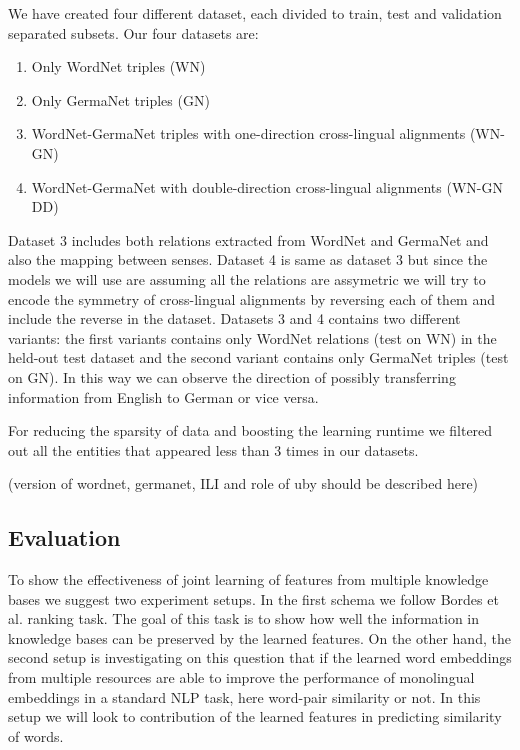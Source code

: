  We have created four different dataset, each divided to train, test and validation separated subsets. Our four datasets are:
 \begin{enumerate}
 \item Only WordNet triples (WN)
 \item Only GermaNet triples (GN)
 \item WordNet-GermaNet triples with one-direction cross-lingual alignments (WN-GN)
 \item WordNet-GermaNet with double-direction cross-lingual alignments (WN-GN DD)
 \end{enumerate}
 
 Dataset 3 includes both relations extracted from WordNet and GermaNet and also the mapping between senses.
 Dataset 4 is same as dataset 3 but since the models we will use are assuming all the relations are assymetric 
 we will try to encode the symmetry of cross-lingual alignments by reversing each of them and include the reverse in the dataset.
 Datasets 3 and 4 contains two different variants: the first variants contains only WordNet relations (test on WN) 
 in the held-out test dataset and the second variant contains only GermaNet triples (test on GN).
  In this way we can observe the direction of
  possibly transferring information from English to German or vice versa.
  
  For reducing the sparsity of data and boosting the learning runtime we 
  filtered out all the entities that appeared less than 3 times in our datasets.
   
  (version of wordnet, germanet, ILI and role of uby should be described here)  
 

\subsection{Evaluation}
\label{ssec:ent-link-eval}

To show the effectiveness of joint learning of features from multiple knowledge bases we suggest 
two experiment setups. In the first schema we follow Bordes et al. ranking task. The goal of this task is
to show how well the information in knowledge bases can be preserved by the learned features. 
 On the other hand, the second
setup is investigating on this question that if the learned word embeddings from multiple resources
are able to improve the performance of monolingual embeddings in a standard NLP
task, here word-pair similarity or not.
In this setup we will look to contribution of the learned features in predicting similarity of words.

